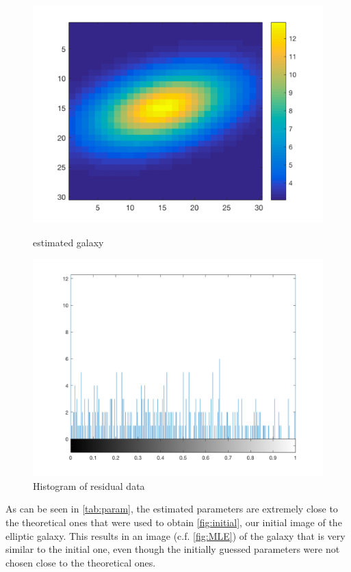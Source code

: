 \begin{figure}[h!]
	\centering
	\begin{minipage}[b]{0.4\textwidth}
		\includegraphics[width=\textwidth]{images/galaxy_MLE}
		\caption{estimated galaxy}
		\label{fig:MLE}
	\end{minipage}
	\begin{minipage}[b]{0.4\textwidth}
		\includegraphics[width=\textwidth]{images/residual_histogram}
		\caption{Histogram of residual data}
		\label{fig:residual}
	\end{minipage}
\end{figure}

As can be seen in \cref{tab:param}, the estimated parameters are extremely close to the theoretical ones that were used to obtain \cref{fig:initial}, our initial image of the elliptic galaxy. This results in an image (c.f. \cref{fig:MLE}) of the galaxy that is very similar to the initial one, even though the initially guessed parameters were not chosen close to the theoretical ones.

